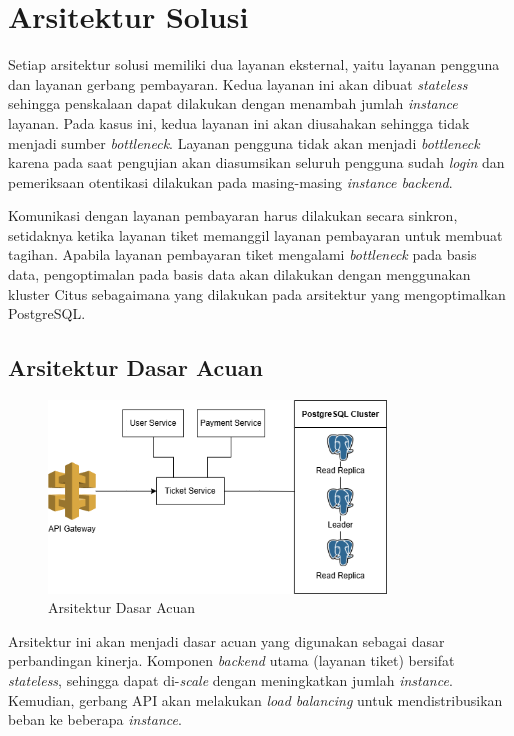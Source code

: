 \section{Arsitektur Solusi}

Setiap arsitektur solusi memiliki dua layanan eksternal, yaitu layanan pengguna dan layanan gerbang pembayaran. Kedua layanan ini akan dibuat \textit{stateless} sehingga penskalaan dapat dilakukan dengan menambah jumlah \textit{instance} layanan. Pada kasus ini, kedua layanan ini akan diusahakan sehingga tidak menjadi sumber \textit{bottleneck}. Layanan pengguna tidak akan menjadi \textit{bottleneck} karena pada saat pengujian akan diasumsikan seluruh pengguna sudah \textit{login} dan pemeriksaan otentikasi dilakukan pada masing-masing \textit{instance backend}.

Komunikasi dengan layanan pembayaran harus dilakukan secara sinkron, setidaknya ketika layanan tiket memanggil layanan pembayaran untuk membuat tagihan. Apabila layanan pembayaran tiket mengalami \textit{bottleneck} pada basis data, pengoptimalan pada basis data akan dilakukan dengan menggunakan kluster Citus sebagaimana yang dilakukan pada arsitektur yang mengoptimalkan PostgreSQL.

\subsection{Arsitektur Dasar Acuan}

\begin{figure}[ht]
    \centering
    \includegraphics[width=0.8\textwidth]{resources/chapter-3/architecture-reference.png}
    \caption{Arsitektur Dasar Acuan}
    \label{fig:baseline-architecture}
\end{figure}

Arsitektur ini akan menjadi dasar acuan yang digunakan sebagai dasar perbandingan kinerja. Komponen \textit{backend} utama (layanan tiket) bersifat \textit{stateless}, sehingga dapat di-\textit{scale} dengan meningkatkan jumlah \textit{instance}. Kemudian, gerbang API akan melakukan \textit{load balancing} untuk mendistribusikan beban ke beberapa \textit{instance}.

